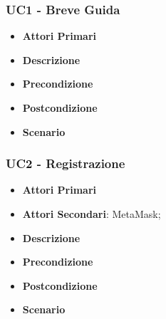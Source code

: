 \subsubsection{UC1 - Breve Guida}
\begin{itemize}
	\item \textbf{Attori Primari}
	\item \textbf{Descrizione}
	\item \textbf{Precondizione}
	\item \textbf{Postcondizione}
	\item \textbf{Scenario}
\end{itemize}
\subsubsection{UC2 - Registrazione}
\begin{itemize}
	\item \textbf{Attori Primari}
	\item \textbf{Attori Secondari}: MetaMask\glo;
	\item \textbf{Descrizione}
	\item \textbf{Precondizione}
	\item \textbf{Postcondizione}
	\item \textbf{Scenario}
\end{itemize}
